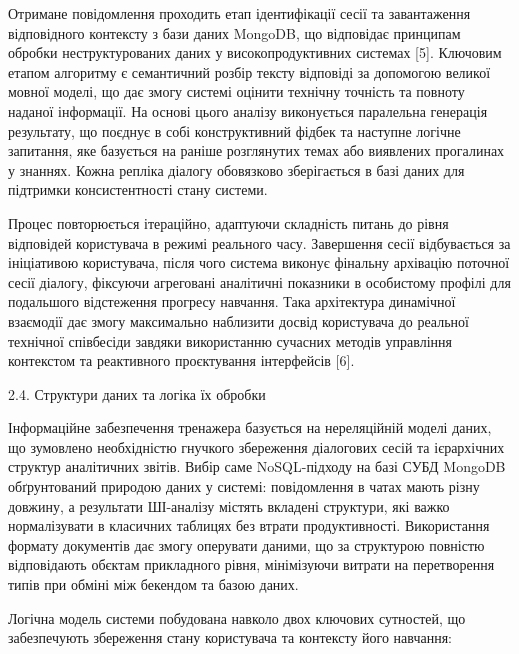 Отримане повідомлення проходить етап ідентифікації сесії та завантаження
відповідного контексту з бази даних MongoDB, що відповідає принципам
обробки неструктурованих даних у високопродуктивних системах {[}5{]}.
Ключовим етапом алгоритму є семантичний розбір тексту відповіді за
допомогою великої мовної моделі, що дає змогу системі оцінити технічну
точність та повноту наданої інформації. На основі цього аналізу
виконується паралельна генерація результату, що поєднує в собі
конструктивний фідбек та наступне логічне запитання, яке базується на
раніше розглянутих темах або виявлених прогалинах у знаннях. Кожна
репліка діалогу обов\textquotesingle язково зберігається в базі даних
для підтримки консистентності стану системи.

Процес повторюється ітераційно, адаптуючи складність питань до рівня
відповідей користувача в режимі реального часу. Завершення сесії
відбувається за ініціативою користувача, після чого система виконує
фінальну архівацію поточної сесії діалогу, фіксуючи агреговані
аналітичні показники в особистому профілі для подальшого відстеження
прогресу навчання. Така архітектура динамічної взаємодії дає змогу
максимально наблизити досвід користувача до реальної технічної
співбесіди завдяки використанню сучасних методів управління контекстом
та реактивного проєктування інтерфейсів {[}6{]}.

\protect{}\label{_Toc228981062}{}2.4. Структури даних та
логіка їх обробки

Інформаційне забезпечення тренажера базується на нереляційній моделі
даних, що зумовлено необхідністю гнучкого збереження діалогових сесій та
ієрархічних структур аналітичних звітів. Вибір саме NoSQL-підходу на
базі СУБД MongoDB обґрунтований природою даних у системі: повідомлення в
чатах мають різну довжину, а результати ШІ-аналізу містять вкладені
структури, які важко нормалізувати в класичних таблицях без втрати
продуктивності. Використання формату документів дає змогу оперувати
даними, що за структурою повністю відповідають об\textquotesingle єктам
прикладного рівня, мінімізуючи витрати на перетворення типів при обміні
між бекендом та базою даних.

Логічна модель системи побудована навколо двох ключових сутностей, що
забезпечують збереження стану користувача та контексту його навчання:

